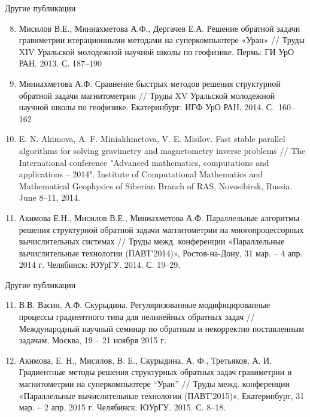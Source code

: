 \documentclass[10pt,pdf, mathserif, hyperref={unicode}]{beamer}
\begin{document}
\begin{frame}{Другие публикации}
	\begin{enumerate}
		\setcounter{enumi}{7}
			\item Мисилов В.Е., Миниахметова А.Ф., Дергачев Е.А. Решение обратной задачи гравиметрии итерационными методами на суперкомпьютере «Уран» // Труды XIV Уральской молодежной научной школы по геофизике. Пермь:
			ГИ УрО РАН.  2013. С. 187–190
			\item Миниахметова А.Ф. Сравнение быстрых методов решения структурной обратной задачи магнитометрии // Труды XV Уральской молодежной научной школы по геофизике. Екатеринбург: ИГФ УрО РАН. 2014. С.~160–162
			\item E. N. Akimova, A. F. Miniakhmetova, V. E. Misilov. Fast stable parallel algorithms for solving gravimetry and magnetometry inverse problems // The International conference "Advanced mathematics, computations and applications – 2014". Institute of Computational Mathematics and Mathematical Geophysics of Siberian Branch of RAS, Novosibirsk, Russia. June 8–11, 2014.
			\item Акимова Е.Н., Мисилов В.Е., Миниахметова А.Ф. Параллельные алгоритмы решения структурной обратной задачи магнитометрии на многопроцессорных вычислительных системах  // Труды межд. конференции «Параллельные вычислительные технологии (ПАВТ’2014)», Ростов-на-Дону, 31 мар. – 4 апр. 2014 г. Челябинск:  ЮУрГУ. 2014. С. 19–29.
	\end{enumerate}
\end{frame}
\begin{frame}{Другие публикации}
	\begin{enumerate}
		\setcounter{enumi}{10}
		\item В.В. Васин, А.Ф. Скурыдина. Регуляризованные модифицированные процессы градиентного типа для нелинейных обратных задач // Международный научный семинар по обратным и некорректно поставленным задачам. Москва, 19 – 21 ноября 2015 г.
		\item Акимова, Е. Н., Мисилов, В. Е., Скурыдина, А. Ф., Третьяков, А. И. Градиентные методы решения структурных обратных задач гравиметрии и магнитометрии на суперкомпьютере “Уран” // Труды межд. конференции «Параллельные вычислительные технологии (ПАВТ’2015)», Екатеринбург, 31 мар. – 2 апр. 2015 г. Челябинск: ЮУрГУ.  2015. С. 8–18.
	\end{enumerate}
\end{frame}
\end{document}
